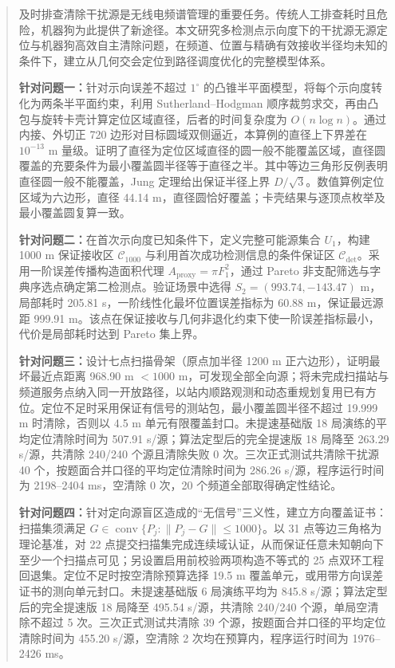 \begin{abstract}
及时排查清除干扰源是无线电频谱管理的重要任务。传统人工排查耗时且危险，机器狗为此提供了新途径。本文研究多检测点示向度下的干扰源无源定位与机器狗高效自主清除问题，在频道、位置与精确有效接收半径均未知的条件下，建立从几何交会定位到路径调度优化的完整模型体系。

\textbf{针对问题一：}针对示向误差不超过 \(1^\circ\) 的凸锥半平面模型，将每个示向度转化为两条半平面约束，利用 Sutherland--Hodgman 顺序裁剪求交，再由凸包与旋转卡壳计算定位区域直径，后者的时间复杂度为 \(O(n\log n)\)。通过内接、外切正 720 边形对目标圆域双侧逼近，本算例的直径上下界差在 \(10^{-13}\) m 量级。证明了直径为定位区域直径的圆一般不能覆盖区域，直径圆覆盖的充要条件为最小覆盖圆半径等于直径之半。其中等边三角形反例表明直径圆一般不能覆盖，Jung 定理给出保证半径上界 \(D/\sqrt3\)。数值算例定位区域为六边形，直径 44.14 m，直径圆恰好覆盖；卡壳结果与逐顶点枚举及最小覆盖圆复算一致。

\textbf{针对问题二：}在首次示向度已知条件下，定义完整可能源集合 \(U_1\)，构建 1000 m 保证接收区 \(\mathcal C_{1000}\) 与利用首次成功检测信息的条件保证区 \(\mathcal C_{\det}\)。采用一阶误差传播构造面积代理 \(A_{\mathrm{proxy}}=\pi F_1^2\)，通过 Pareto 非支配筛选与字典序选点确定第二检测点。验证场景中选得 \(S_2=(993.74,-143.47)\) m，局部耗时 205.81 s，一阶线性化最坏位置误差指标为 60.88 m，保证最远源距 999.91 m。该点在保证接收与几何非退化约束下使一阶误差指标最小，代价是局部耗时达到 Pareto 集上界。

\textbf{针对问题三：}设计七点扫描骨架（原点加半径 1200 m 正六边形），证明最坏最近点距离 968.90 m \(<1000\) m，可发现全部全向源；将未完成扫描站与频道服务点纳入同一开放路径，以站内顺路观测和动态重规划复用已有方位。定位不足时采用保证有信号的测站包，最小覆盖圆半径不超过 19.999 m 时清除，否则以 4.5 m 单元有限覆盖封口。未提速基础版 18 局演练的平均定位清除时间为 507.91 s/源；算法定型后的完全提速版 18 局降至 263.29 s/源，共清除 240/240 个源且清除失败 0 次。三次正式测试共清除干扰源 40 个，按题面合并口径的平均定位清除时间为 286.26 s/源，程序运行时间为 2198--2404 ms，空清除 0 次，20 个频道全部取得确定性结论。

\textbf{针对问题四：}针对定向源盲区造成的“无信号”三义性，建立方向覆盖证书：扫描集须满足 \(G\in\operatorname{conv}\{P_j:\|P_j-G\|\le1000\}\)。以 31 点等边三角格为理论基准，对 22 点提交扫描集完成连续域认证，从而保证任意未知朝向下至少一个扫描点可见；另设置启用前校验两项构造不等式的 25 点双环工程回退集。定位不足时按空清除预算选择 19.5 m 覆盖单元，或用带方向误差证书的测向单元封口。未提速基础版 6 局演练平均为 845.8 s/源；算法定型后的完全提速版 18 局降至 495.54 s/源，共清除 240/240 个源，单局空清除不超过 5 次。三次正式测试共清除 39 个源，按题面合并口径的平均定位清除时间为 455.20 s/源，空清除 2 次均在预算内，程序运行时间为 1976--2426 ms。


\end{abstract}

